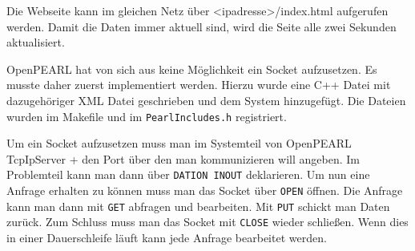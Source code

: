 Die Webseite kann im gleichen Netz über <ipadresse>/index.html aufgerufen werden. Damit die Daten immer aktuell sind, wird die Seite alle zwei Sekunden aktualisiert.

OpenPEARL hat von sich aus keine Möglichkeit ein Socket aufzusetzen. Es musste daher zuerst implementiert werden. Hierzu wurde eine C++ Datei mit dazugehöriger XML Datei geschrieben und dem System hinzugefügt. Die Dateien wurden im Makefile und im \texttt{PearlIncludes.h} registriert. 

Um ein Socket aufzusetzen muss man im Systemteil von OpenPEARL TcpIpServer + den Port über den man kommunizieren will angeben. Im Problemteil kann man dann über \texttt{DATION INOUT} deklarieren. Um nun eine Anfrage erhalten zu können muss man das Socket über \texttt{OPEN} öffnen. Die Anfrage kann man dann mit \texttt{GET} abfragen und bearbeiten. Mit \texttt{PUT} schickt man Daten zurück. Zum Schluss muss man das Socket mit \texttt{CLOSE}  wieder schließen. Wenn dies in einer Dauerschleife läuft kann jede Anfrage bearbeitet werden. 
